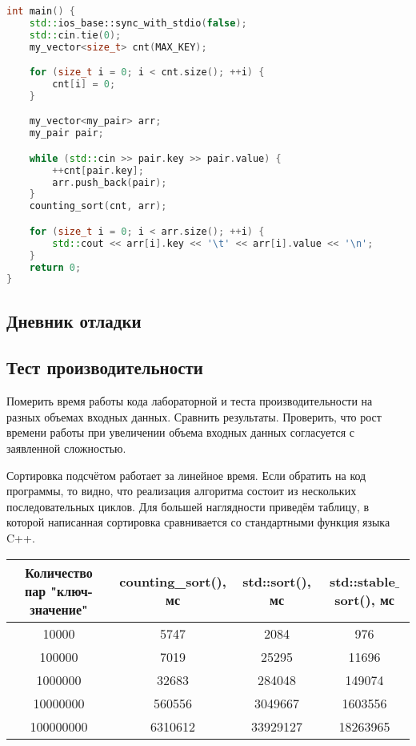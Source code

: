 \documentclass[12pt]{article}
\begin{document}
\begin{lstlisting}[language=C++]
int main() {
    std::ios_base::sync_with_stdio(false);
    std::cin.tie(0);
    my_vector<size_t> cnt(MAX_KEY);

    for (size_t i = 0; i < cnt.size(); ++i) {
        cnt[i] = 0;
    }

    my_vector<my_pair> arr;
    my_pair pair;

    while (std::cin >> pair.key >> pair.value) {
        ++cnt[pair.key];
        arr.push_back(pair);
    }
    counting_sort(cnt, arr);

    for (size_t i = 0; i < arr.size(); ++i) {
        std::cout << arr[i].key << '\t' << arr[i].value << '\n';
    }
    return 0;
}
\end{lstlisting}

\subsection*{Дневник отладки}

\subsection*{Тест производительности}

Померить время работы кода лабораторной и теста производительности
на разных объемах входных данных. Сравнить результаты. Проверить,
что рост времени работы при увеличении объема входных данных
согласуется с заявленной сложностью.

Сортировка подсчётом работает за линейное время. Если обратить на код программы, то видно, что реализация алгоритма состоит из нескольких последовательных циклов. Для большей наглядности приведём таблицу, в которой написанная сортировка сравнивается со стандартными функция языка C++.

\begin{center}
\begin{tabular}{ |c|c|c|c| }
    \hline
    Количество пар "ключ-значение" & counting\_sort(), мс & std::sort(), мс & std::stable$\_$sort(), мс \\
    \hline
    10000 & 5747 & 2084 & 976 \\
    100000 & 7019 & 25295 & 11696 \\
    1000000 & 32683 & 284048 & 149074 \\
    10000000 & 560556 & 3049667 & 1603556 \\
    100000000 & 6310612 & 33929127 & 18263965 \\
    \hline
    \end{tabular}
\end{center}
\end{document}
